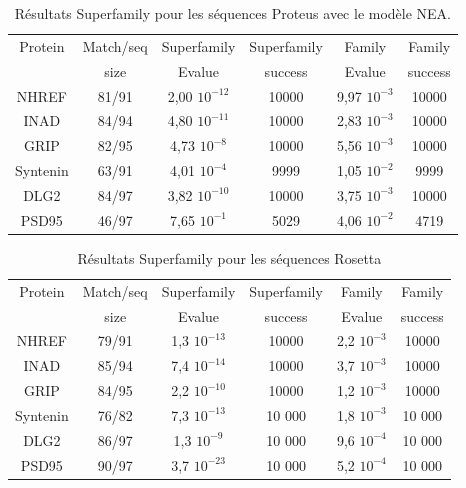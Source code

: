 \begin{table}[h]
       \centering
  \caption{Résultats Superfamily pour les séquences Proteus avec le modèle NEA.}   
  \label{tab:superfamily_model_B6}         
  \begin{tabular}{cccccc}
    
    \toprule
    Protein & Match/seq & Superfamily & Superfamily & Family & Family \\
            & size      & Evalue      & success     & Evalue & success\\
    \cmidrule{1-6}
    NHREF  & 81/91 &     2,00 $10^{-12}$ & 10000  & 9,97 $10^{-3}$ & 10000  \\
    INAD  & 84/94 &      4,80 $10^{-11}$ & 10000  & 2,83 $10^{-3}$ & 10000  \\
    GRIP  & 82/95 &      4,73 $10^{-8}$  & 10000  & 5,56 $10^{-3}$ & 10000  \\
    Syntenin  & 63/91 &  4,01 $10^{-4}$  &  9999  & 1,05 $10^{-2}$ &  9999  \\
    DLG2  & 84/97 &      3,82 $10^{-10}$ & 10000  & 3,75 $10^{-3}$ & 10000  \\
    PSD95  & 46/97 &     7,65 $10^{-1}$  &  5029  & 4,06 $10^{-2}$ &  4719  \\

    \bottomrule        
  \end{tabular}   
\end{table}
\begin{table}[h]
    \caption{Résultats Superfamily pour les séquences Rosetta}   
    \label{tab:superfamily_bestRE}       
    \centering
  \begin{tabular}{cccccc}
    \toprule
    Protein & Match/seq & Superfamily & Superfamily & Family & Family \\
            & size      & Evalue      & success     & Evalue & success\\
    \cmidrule{1-6}
    NHREF    & 79/91   &    1,3 $10^{-13}$ & 10000 & 2,2 $10^{-3}$ & 10000 \\
    INAD     & 85/94   &    7,4 $10^{-14}$ & 10000 & 3,7 $10^{-3}$ & 10000 \\
    GRIP     & 84/95   &    2,2 $10^{-10}$ & 10000 & 1,2 $10^{-3}$ & 10000 \\
    Syntenin & 76/82   &    7,3 $10^{-13}$ & 10 000 & 1,8 $10^{-3}$ & 10 000 \\
    DLG2     & 86/97   &    1,3 $10^{-9}$  & 10 000 & 9,6 $10^{-4}$ & 10 000 \\
    PSD95    & 90/97   &    3,7 $10^{-23}$ & 10 000 & 5,2 $10^{-4}$ & 10 000 \\
    \bottomrule        
  \end{tabular}   
\end{table}

